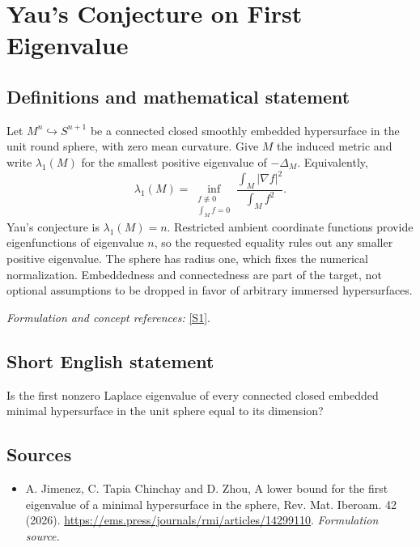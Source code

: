 \documentclass[11pt]{article}
\begin{document}
\section*{\texorpdfstring{Yau's Conjecture on First Eigenvalue}{Yau's Conjecture on First Eigenvalue}}\label{1377}
\subsection{Definitions and mathematical statement}
Let $M^n\hookrightarrow S^{n+1}$ be a connected closed smoothly embedded hypersurface in the unit round sphere, with zero mean curvature. Give $M$ the induced metric and write $\lambda_1(M)$ for the smallest positive eigenvalue of $-\Delta_M$. Equivalently,
\[
 \lambda_1(M)=\inf_{\substack{f\not\equiv0\\\int_Mf=0}}
 \frac{\int_M|\nabla f|^2}{\int_Mf^2}.
\]
Yau's conjecture is $\lambda_1(M)=n$. Restricted ambient coordinate functions provide eigenfunctions of eigenvalue $n$, so the requested equality rules out any smaller positive eigenvalue. The sphere has radius one, which fixes the numerical normalization. Embeddedness and connectedness are part of the target, not optional assumptions to be dropped in favor of arbitrary immersed hypersurfaces.
\par\smallskip\textit{Formulation and concept references:} \href{https://ems.press/journals/rmi/articles/14299110}{[S1]}.

\subsection{Short English statement}
Is the first nonzero Laplace eigenvalue of every connected closed embedded minimal hypersurface in the unit sphere equal to its dimension?
\subsection{Sources}
\begin{itemize}
\item[S1]A. Jimenez, C. Tapia Chinchay and D. Zhou, A lower bound for the first eigenvalue of a minimal hypersurface in the sphere, Rev. Mat. Iberoam. 42 (2026).
\url{https://ems.press/journals/rmi/articles/14299110}.
\textit{Formulation source.}
\end{itemize}
\end{document}
